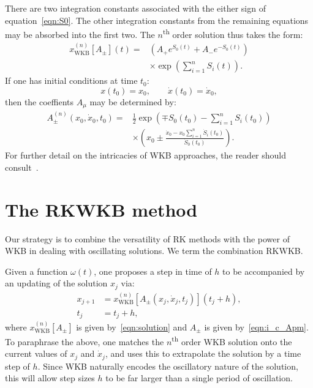 There are two integration constants associated with the either sign of equation~\eqref{eqn:S0}. The other integration constants from the remaining equations may be absorbed into the first two. The $n$\textsuperscript{th} order solution thus takes the form:
\begin{align}
  x_\mathrm{WKB}^{(n)}[A_{\pm}](t) =&
  \left( A_{+} e^{S_0(t)} + A_{-} e^{-S_0(t)} \right)
  \nonumber\\
  &\times \exp\left( \sum_{i=1}^n S_i(t) \right).
  \label{eqn:solution}
\end{align}
If one has initial conditions at time $t_0$:
\begin{equation}
  x(t_0) = x_0, \qquad \dot{x}(t_0)=\dot{x}_0,
  \label{eqn:i_c}
\end{equation}
then the coeffients $A_\mu$ may be determined by:
\begin{align}
  A_\pm^{(n)}(x_0,\dot{x}_0,t_0) =& \frac{1}{2}\exp{\left( \mp S_0(t_0) - \sum_{i=1}^n S_i(t_0) \right)}
  \nonumber\\
  &\times\left( x_0 \pm  \frac{\dot{x}_0-x_0\sum_{i=1}^n \dot{S}_i(t_0)}{\dot{S}_0(t_0)}\right).
  \label{eqn:i_c_Apm}
\end{align}
For further detail on the intricacies of WKB approaches, the reader should consult~\cite{RHB,Bender+2010}.

\section{The RKWKB method}
Our strategy is to combine the versatility of RK methods with the power of WKB in dealing with oscillating solutions. We term the combination RKWKB\@.

Given a function $\omega(t)$, one proposes a step in time of $h$ to be accompanied by an updating of the solution $x_j$ via:
\begin{align}
  x_{j+1} &= x_\mathrm{WKB}^{(n)}[A_\pm(x_j,\dot{x}_j,t_j)](t_j+h),
  \label{eqn:WKB_x_step} \\
  t_j &= t_j+h,
  \label{eqn:WKB_t_step}
\end{align}
where $x_\mathrm{WKB}^{(n)}[A_{\pm}]$ is given by~\eqref{eqn:solution} and $A_{\pm}$ is given by~\eqref{eqn:i_c_Apm}.
To paraphrase the above, one matches the $n$\textsuperscript{th} order WKB solution onto the current values of $x_j$ and $\dot{x}_j$, and uses this to extrapolate the solution by a time step of $h$. Since WKB naturally encodes the oscillatory nature of the solution, this will allow step sizes $h$ to be far larger than a single period of oscillation. 

